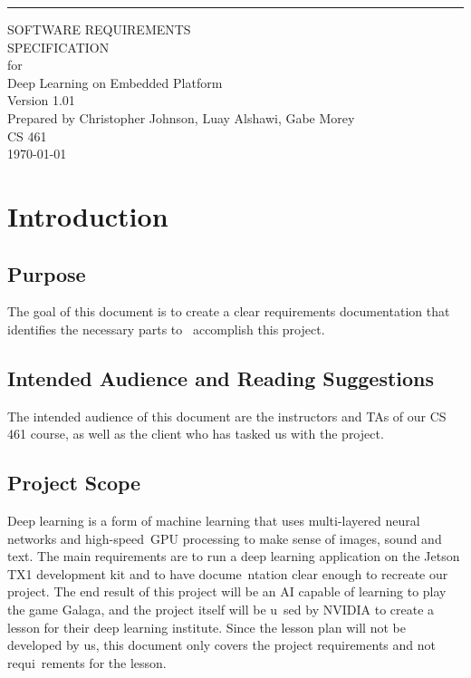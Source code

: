 \documentclass{scrreprt}
\date{}
\def\myversion{1.01 }
\begin{document}
\begin{flushright}
    \rule{16cm}{5pt}\vskip1cm
    \begin{bfseries}
        \Huge{SOFTWARE REQUIREMENTS\\ SPECIFICATION}\\
        \vspace{1.9cm}
        for\\
        \vspace{1.9cm}
        Deep Learning on Embedded Platform\\
        \vspace{1.9cm}
        \LARGE{Version \myversion}\\
        \vspace{1.9cm}
        Prepared by Christopher Johnson, Luay Alshawi, Gabe Morey\\
        \vspace{1.9cm}
        CS 461\\
        \vspace{1.9cm}
        \today\\
    \end{bfseries}
\end{flushright}

\tableofcontents

\chapter{Introduction}

\section{Purpose}
The goal of this document is to create a clear requirements documentation that identifies the necessary parts to \
accomplish this project.

\section{Intended Audience and Reading Suggestions}
The intended audience of this document are the instructors and TAs of our CS 461 course, as well as the client who has tasked us with the project.

\section{Project Scope}
Deep learning is a form of machine learning that uses multi-layered neural networks and high-speed\
 GPU processing to make sense of images, sound and text.
The main requirements are to run a deep learning application on the Jetson TX1 development kit and to have docume\
ntation clear enough to recreate our project.
The end result of this project will be an AI capable of learning to play the game Galaga, and the project itself will be u\
sed by NVIDIA to create a lesson for their deep learning institute.
Since the lesson plan will not be developed by us, this document only covers the project requirements and not requi\
rements for the lesson.
\end{document}
